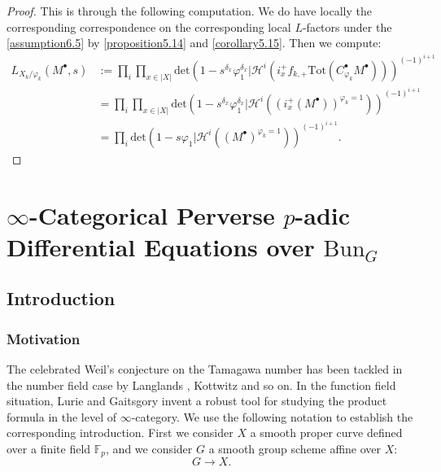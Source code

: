 \documentclass[11pt]{book}
\theoremstyle{definition}
\numberwithin{equation}{section}
\begin{document}
\begin{proof}
This is through the following computation. We do have locally the corresponding correspondence on the corresponding local $L$-factors under the \cref{assumption6.5} by \cref{proposition5.14} and \cref{corollary5.15}. Then we compute:
\begin{align}
L_{X_k/\varphi_k}(M^\bullet,s)&:=\prod_i\prod_{x\in |X|}\mathrm{det}\left(1-s^{\delta_x}\varphi_1^{\delta_x}|\mathcal{H}^i(i_{x}^+f_{k,+}\mathrm{Tot}(C^\bullet_{\varphi_k}M^\bullet))\right)^{(-1)^{i+1}}\\
&=	\prod_i\prod_{x\in |X|}\mathrm{det}\left(1-s^{\delta_x}\varphi_1^{\delta_x}|\mathcal{H}^i((i_{x}^+(M^\bullet))^{\varphi_k=1})\right)^{(-1)^{i+1}}\\
&=	\prod_i\mathrm{det}\left(1-s\varphi_1|\mathcal{H}^i((M^\bullet)^{\varphi_k=1})\right)^{(-1)^{i+1}}.
\end{align}

\end{proof}





\newpage
\chapter{$\infty$-Categorical Perverse $p$-adic Differential Equations over $\mathrm{Bun}_G$}

\section{Introduction}

\subsection{Motivation}

The celebrated Weil's conjecture on the Tamagawa number has been tackled in the number field case by Langlands \cite{Lan}, Kottwitz \cite{Ko} and so on. In the function field situation, Lurie and Gaitsgory \cite{GL1} invent a robust tool for studying the product formula in the level of $\infty$-category. We use the following notation to establish the corresponding introduction. First we consider $X$ a smooth proper curve defined over a finite field $\mathbb{F}_p$, and we consider $G$ a smooth group scheme affine over $X$:
\begin{displaymath}
G\rightarrow X.	
\end{displaymath}
\end{document}

